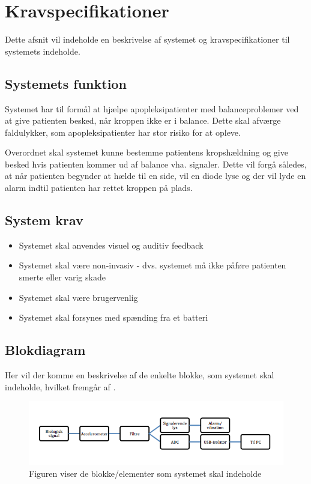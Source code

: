 \section{Kravspecifikationer}
Dette afsnit vil indeholde en beskrivelse af systemet og kravspecifikationer til systemets indeholde. 

\subsection{Systemets funktion}
Systemet har til formål at hjælpe apopleksipatienter med balanceproblemer ved at give patienten besked, når kroppen ikke er i balance. Dette skal afværge faldulykker, som apopleksipatienter har stor risiko for at opleve.

Overordnet skal systemet kunne bestemme patientens kropshældning og give besked hvis patienten kommer ud af balance vha. signaler. Dette vil forgå således, at når patienten begynder at hælde til en side, vil en diode lyse og der vil lyde en alarm indtil patienten har rettet kroppen på plads. 

\subsection{System krav}
\begin{itemize}
\item Systemet skal anvendes visuel og auditiv feedback 
\item Systemet skal være non-invasiv - dvs. systemet må ikke påføre patienten smerte eller varig skade
\item Systemet skal være brugervenlig
\item Systemet skal forsynes med spænding fra et batteri
\end{itemize}

\subsection{Blokdiagram}
Her vil der komme en beskrivelse af de enkelte blokke, som systemet skal indeholde, hvilket fremgår af .

\begin{figure}[H]
	\centering
	\includegraphics[scale=0.8]{figures/bProblemanalyse/Kravspecifikationer - blokdiagram.png}
	\caption{Figuren viser de blokke/elementer som systemet skal indeholde}
	\label{krav_blok}
\end{figure}

